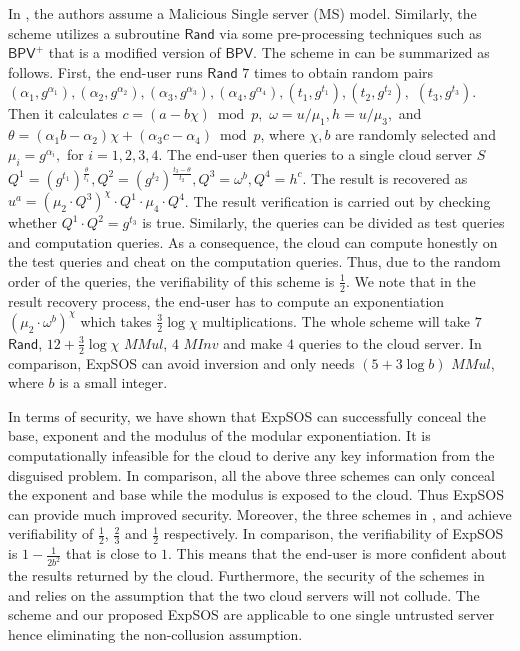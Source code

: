 \documentclass[english,draftcls,onecolumn,11pt]{IEEEtran}
\theoremstyle{definition}
\theoremstyle{plain}
\theoremstyle{plain}
\theoremstyle{definition}
\begin{document}
In \cite{wang2014securely}, the authors assume a Malicious Single
server (MS) model. Similarly, the scheme utilizes a subroutine $\mathsf{Rand}$
via some pre-processing techniques such as $\mathsf{BPV^{+}}$ that
is a modified version of $\mathsf{BPV}$. The scheme in \cite{wang2014securely}
can be summarized as follows. First, the end-user runs $\mathsf{Rand}$
$7$ times to obtain random pairs $(\alpha_{1},g^{\alpha_{1}})\ensuremath{,}(\alpha_{2},g^{\alpha_{2}})\ensuremath{,}(\alpha_{3},g^{\alpha_{3}})\ensuremath{,}(\alpha_{4},g^{\alpha_{4}})\ensuremath{,}(t_{1},g^{t_{1}})\ensuremath{,}(t_{2},g^{t_{2}}),$
$(t_{3},g^{t_{3}})$. Then it calculates $c=(a-b\chi)\bmod p\ensuremath{,}$
$\omega=u/\mu_{1}\ensuremath{,}h=u/\mu_{3},$ and $\theta=(\alpha_{1}b-\alpha_{2})\chi+(\alpha_{3}c-\alpha_{4})\bmod p$,
where $\chi,b$ are randomly selected and $\mu_{i}=g^{\alpha_{i}},$
for $i=1,2,3,4$. The end-user then queries to a single cloud server
$S$ $Q^{1}=\left(g^{t_{1}}\right){}^{\frac{\theta}{t_{1}}}\ensuremath{,}Q^{2}=\left(g^{t_{2}}\right){}^{\frac{t_{3}-\theta}{t_{2}}},Q^{3}=\omega^{b}\ensuremath{,}Q^{4}=h^{c}$.
The result is recovered as $u^{a}=(\mu_{2}\cdot Q^{3})^{\chi}\cdot Q^{1}\cdot\mu_{4}\cdot Q^{4}$.
The result verification is carried out by checking whether $Q^{1}\cdot Q^{2}=g^{t_{3}}$
is true. Similarly, the queries can be divided as test queries and
computation queries. As a consequence, the cloud can compute honestly
on the test queries and cheat on the computation queries. Thus, due
to the random order of the queries, the verifiability of this scheme
is $\frac{1}{2}$. We note that in the result recovery process, the
end-user has to compute an exponentiation $(\mu_{2}\cdot\omega^{b})^{\chi}$
which takes $\frac{3}{2}\log\chi$ multiplications. The whole scheme
will take $7$ $\mathsf{Rand}$, $12+\frac{3}{2}\log\chi$ $MMul$,
$4$ $MInv$ and make $4$ queries to the cloud server. In comparison,
ExpSOS can avoid inversion and only needs $(5+3\log b)$ $MMul$,
where $b$ is a small integer. 

In terms of security, we have shown that ExpSOS can successfully conceal
the base, exponent and the modulus of the modular exponentiation.
It is computationally infeasible for the cloud to derive any key information
from the disguised problem. In comparison, all the above three schemes
\cite{hohenberger2005securely,chen2012new,wang2014securely} can only
conceal the exponent and base while the modulus is exposed to the
cloud. Thus ExpSOS can provide much improved security. Moreover, the
three schemes in \cite{hohenberger2005securely},\cite{chen2012new}
and \cite{wang2014securely} achieve verifiability of $\frac{1}{2}$,
$\frac{2}{3}$ and $\frac{1}{2}$ respectively. In comparison, the
verifiability of ExpSOS is $1-\frac{1}{2b^{2}}$ that is close to
$1$. This means that the end-user is more confident about the results
returned by the cloud. Furthermore, the security of the schemes in
\cite{hohenberger2005securely} and \cite{chen2012new} relies on
the assumption that the two cloud servers will not collude. The scheme
\cite{wang2014securely} and our proposed ExpSOS are applicable to
one single untrusted server hence eliminating the non-collusion assumption.
\end{document}
